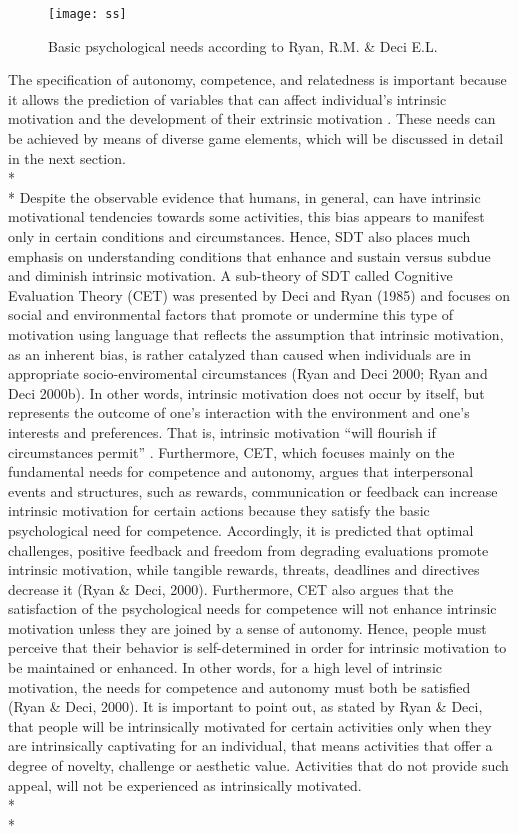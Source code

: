\begin{figure}[h]
    \centering
    \texttt{[image: ss]}
    \caption{Basic psychological needs according to Ryan, R.M. \& Deci E.L.}
    \label{fig:ss}
\end{figure}
The specification of autonomy, competence, and relatedness is important because it allows the prediction of variables that can affect individual's intrinsic motivation and the development of their extrinsic motivation \cite{deci1994promoting}. These needs can be achieved by means of diverse game elements, which will be discussed in detail in the next section.\\*\\*
Despite the observable evidence that humans, in general, can have intrinsic motivational tendencies towards some activities, this bias appears to manifest only in certain conditions and circumstances. Hence, SDT also places much emphasis on understanding conditions that enhance and sustain versus subdue and diminish intrinsic motivation.  A sub-theory of SDT called Cognitive Evaluation Theory (CET) was presented by Deci and Ryan (1985) and focuses on social and environmental factors that promote or undermine this type of motivation using language that reflects the assumption that intrinsic motivation, as an inherent bias, is rather catalyzed than caused when individuals are in appropriate socio-enviromental circumstances (Ryan  and  Deci  2000;  Ryan and Deci 2000b). In other words, intrinsic motivation does not occur by itself, but represents the outcome of one's interaction with the environment and one's interests and preferences. That is, intrinsic motivation ``will flourish if circumstances permit'' \cite{ryan2000self}. Furthermore, CET, which focuses mainly on the fundamental needs for competence and autonomy, argues that interpersonal events and structures, such as rewards, communication or feedback can increase intrinsic motivation for certain actions because they satisfy the basic psychological need for competence. Accordingly, it is predicted that optimal challenges, positive feedback and freedom from degrading evaluations promote intrinsic motivation, while tangible rewards, threats,  deadlines  and  directives decrease it (Ryan \& Deci, 2000). Furthermore, CET also argues that the satisfaction of the psychological needs for competence will not enhance intrinsic motivation unless they are joined by a sense of autonomy. Hence, people must perceive that their behavior is self-determined in order for intrinsic motivation to be maintained or enhanced. In other words, for a high level of intrinsic motivation, the needs for competence and autonomy must both be satisfied (Ryan \& Deci, 2000). It is important to point out, as stated by Ryan \& Deci, that people will be intrinsically motivated for certain activities only when they are intrinsically captivating for an individual, that means activities that offer a degree of novelty, challenge or aesthetic value. Activities that do not provide such appeal, will not be experienced as intrinsically motivated. \\*\\*

